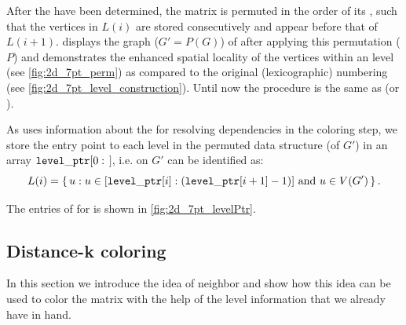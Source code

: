 After the \levels have been determined, the matrix is permuted in the order of its \levels, such that the vertices in $L(i)$ are stored consecutively and appear before that of $L(i+1)$.  displays the graph ($G' = P(G)$) of \stex after applying this permutation ($P$) and demonstrates the enhanced spatial locality of the vertices within an level (see \cref{fig:2d_7pt_perm}) as compared to the original (lexicographic) numbering (see \cref{fig:2d_7pt_level_construction}).  Until now the procedure is the same as \BFS (or \RCM). 

As \RACE uses information about the \levels for resolving dependencies in the coloring step, we store the entry point to each level in the permuted data structure (of $G'$) in an array ${\tt level\_ptr}[0:$ \totalLvl$]$, i.e. \levels on $G'$ can be identified as:
\begin{equation*}
	L(i) = \set{ u : u \in [{\tt level\_ptr} [i]:({\tt level\_ptr} [i+1]-1)] \text{ and } u \in V(G')} .
\end{equation*}

The entries of \levelPtr for \stex is shown in \cref{fig:2d_7pt_levelPtr}. 
 
 \subsection{Distance-k coloring} \label{subsec:DK}
In this section we introduce the idea of \DK neighbor and show how this idea can be used to color the matrix with the help of the level information that we already have in hand.

